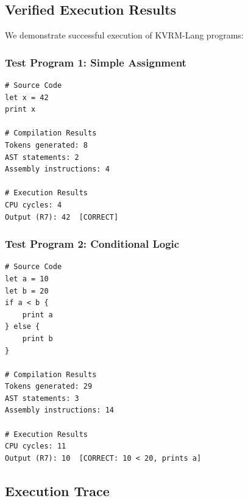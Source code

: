 \documentclass[11pt,a4paper]{article}
\begin{document}
\subsection{Verified Execution Results}

We demonstrate successful execution of KVRM-Lang programs:

\subsubsection{Test Program 1: Simple Assignment}

\begin{lstlisting}[caption=Simple Program Execution]
# Source Code
let x = 42
print x

# Compilation Results
Tokens generated: 8
AST statements: 2
Assembly instructions: 4

# Execution Results
CPU cycles: 4
Output (R7): 42  [CORRECT]
\end{lstlisting}

\subsubsection{Test Program 2: Conditional Logic}

\begin{lstlisting}[caption=Conditional Program Execution]
# Source Code
let a = 10
let b = 20
if a < b {
    print a
} else {
    print b
}

# Compilation Results
Tokens generated: 29
AST statements: 3
Assembly instructions: 14

# Execution Results
CPU cycles: 11
Output (R7): 10  [CORRECT: 10 < 20, prints a]
\end{lstlisting}

\subsection{Execution Trace}
\end{document}
